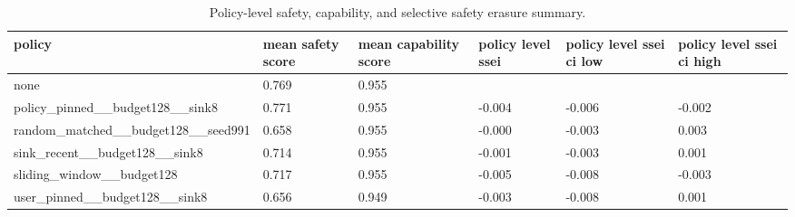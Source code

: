 \begin{table}[t]
\centering
\small
\setlength{\tabcolsep}{3pt}
\begin{tabularx}{\linewidth}{@{}lXXXXX@{}}
\toprule
policy & mean safety score & mean capability score & policy level ssei & policy level ssei ci low & policy level ssei ci high \\
\midrule
none & 0.769 & 0.955 &  &  &  \\
policy\_pinned\_\_budget128\_\_sink8 & 0.771 & 0.955 & -0.004 & -0.006 & -0.002 \\
random\_matched\_\_budget128\_\_seed991 & 0.658 & 0.955 & -0.000 & -0.003 & 0.003 \\
sink\_recent\_\_budget128\_\_sink8 & 0.714 & 0.955 & -0.001 & -0.003 & 0.001 \\
sliding\_window\_\_budget128 & 0.717 & 0.955 & -0.005 & -0.008 & -0.003 \\
user\_pinned\_\_budget128\_\_sink8 & 0.656 & 0.949 & -0.003 & -0.008 & 0.001 \\
\bottomrule
\end{tabularx}
\caption{Policy-level safety, capability, and selective safety erasure summary.}
\label{tab:main-results}
\end{table}
